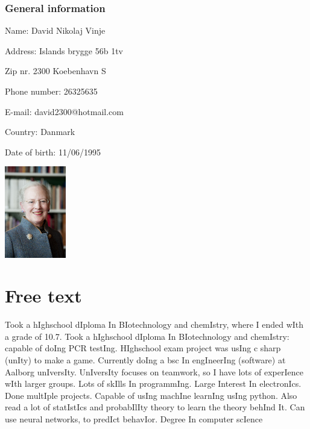 \begin{minipage}[b]{0.45\textwidth} 
\subsubsection*{General information}
 Name: David Nikolaj Vinje 

 Address: Islands brygge 56b 1tv 

 Zip nr. 2300 Koebenhavn S 

 Phone number: 26325635 

 E-mail: david2300@hotmail.com 

 Country: Danmark 

 Date of birth: 11/06/1995 
 \end{minipage}
 \hfill
\begin{minipage}[b]{3cm} \includegraphics[height=4cm]{figures/1200px-Drottning_Margrethe_av_Danmark} \end{minipage}

\section*{Free text}
Took a hIghschool dIploma In BIotechnology and chemIstry, where I ended wIth a grade of 10.7.
Took a hIghschool dIploma In BIotechnology and chemIstry: capable of doIng PCR testIng.
HIghschool exam project was usIng c sharp (unIty) to make a game.
Currently doIng a bsc In engIneerIng (software) at Aalborg unIversIty.
UnIversIty focuses on teamwork, so I have lots of experIence wIth larger groups.
Lots of skIlls In programmIng.
Large Interest In electronIcs. Done multIple projects.
Capable of usIng machIne learnIng usIng python. Also read a lot of statIstIcs and probabIlIty theory to learn the theory behInd It. Can use neural networks, to predIct behavIor.
Degree In computer scIence


